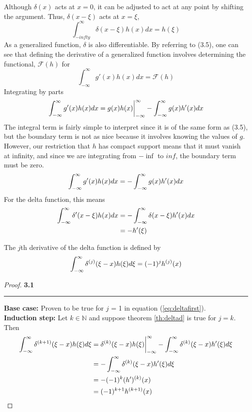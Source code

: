 Although \(\delta(x)\) acts at \(x=0\), it can be adjusted to act at any point by shifting the argument. Thus, \(\delta(x-\xi)\) acts at \(x=\xi\),
\begin{equation}
    \int_{-infty}^{\infty} \delta(x-\xi)h(x)dx = h(\xi)
\end{equation}
As a generalized function, \(\delta\) is also differentiable. By referring to (3.5), one can see that defining the derivative of a generalized function involves determining the functional, \(\mathcal{F}(h)\) for
\begin{equation}
    \int_{-\infty}^{\infty} g'(x)h(x) dx= \mathcal{F}(h)
\end{equation}
Integrating by parts
\begin{equation}
    \int_{-\infty}^{\infty} g'(x)h(x)dx = g(x)h(x)\biggr\rvert_{-\infty}^{\infty} - \int_{-\infty}^{\infty} g(x)h'(x)dx
\end{equation}
The integral term is fairly simple to interpret since it is of the same form as (3.5), but the boundary term is not as nice because it involves knowing the values of \(g\). However, our restriction that \(h\) has compact support means that it must vanish at infinity, and since we are integrating from \(-\inf\) to \(inf\), the boundary term must be zero.
\begin{equation}
    \int_{-\infty}^{\infty} g'(x)h(x)dx = -\int_{-\infty}^{\infty} g(x)h'(x)dx
\end{equation}
For the delta function, this means
\begin{equation}
    \begin{split} \label{eq:deltafirst}
        \int_{-\infty}^{\infty} \delta'(x-\xi)h(x)dx &= -\int_{-\infty}^{\infty}\delta(x-\xi)h'(x)dx\\
        &=-h'(\xi)
    \end{split}
\end{equation}


\begin{theorem} \label{th:deltad}
    The \(j\)th derivative of the delta function is defined by
    \begin{equation}
         \int_{-\infty}^{\infty} \delta^{(j)}(\xi-x)h(\xi)d\xi = (-1)^jh^{(j)}(x)
    \end{equation}
\end{theorem}
\begin{proof} 
    \textbf{3.1}\\
    \noindent\rule{\textwidth}{1pt}
    \textbf{Base case:} Proven to be true for \(j\) = 1 in equation (\ref{eq:deltafirst}).\\
    \textbf{Induction step:} Let \(k \in \mathbb{N}\) and suppose theorem \ref{th:deltad} is true for \(j=k\). Then
    \begin{align*}
        \int_{-\infty}^{\infty} \delta^{(k+1)}(\xi-x)h(\xi)d\xi &= \delta^{(k)}(\xi-x)h(\xi)\biggr\rvert_{-\infty}^{\infty}-\int_{-\infty}^{\infty} \delta^{(k)}(\xi-x)h'(\xi)d\xi\\
        &=-\int_{-\infty}^{\infty} \delta^{(k)}(\xi-x)h'(\xi)d\xi\\
        &=-(-1)^{k}(h')^{(k)}(x)\\
        &=(-1)^{k+1}h^{(k+1)}(x)
    \end{align*}
\end{proof}

